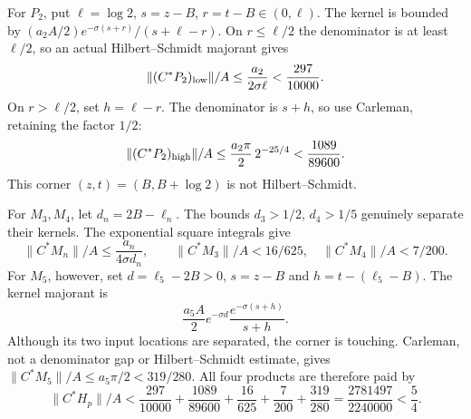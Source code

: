\documentclass[11pt,a4paper]{article}
\numberwithin{equation}{section}
\theoremstyle{remark}\newtheorem{remark}[theorem]{Remark}
\newcommand{\norm}[1]{\lVert#1\rVert}\newcommand{\abs}[1]{\lvert#1\rvert}
\begin{document}
For $P_2$, put $\ell=\log2$, $s=z-B$, $r=t-B\in(0,\ell)$.
The kernel is bounded by
$(a_2A/2)e^{-\sigma(s+r)}/(s+\ell-r)$.
On $r\le\ell/2$ the denominator is at least $\ell/2$, so an actual Hilbert--Schmidt majorant gives
\[
 \norm{(C^*P_2)_{\rm low}}/A
 \le\frac{a_2}{2\sigma\ell}<\frac{297}{10000}.
\]
On $r>\ell/2$, set $h=\ell-r$. The denominator is $s+h$, so use Carleman, retaining the factor $1/2$:
\[
 \norm{(C^*P_2)_{\rm high}}/A
 \le\frac{a_2\pi}{2}\,2^{-25/4}<\frac{1089}{89600}.
\]
This corner $(z,t)=(B,B+\log2)$ is not Hilbert--Schmidt.

For $M_3,M_4$, let $d_n=2B-\ell_n$. The bounds
$d_3>1/2$, $d_4>1/5$ genuinely separate their kernels.
The exponential square integrals give
\[
 \norm{C^*M_n}/A\le\frac{a_n}{4\sigma d_n},\qquad
 \norm{C^*M_3}/A<16/625,\quad \norm{C^*M_4}/A<7/200.
\]
For $M_5$, however, set $d=\ell_5-2B>0$,
$s=z-B$ and $h=t-(\ell_5-B)$.
The kernel majorant is
\[
 \frac{a_5A}{2}e^{-\sigma d}\frac{e^{-\sigma(s+h)}}{s+h}.
\]
Although its two input locations are separated, the corner is touching.
Carleman, not a denominator gap or Hilbert--Schmidt estimate, gives
$\norm{C^*M_5}/A\le a_5\pi/2<319/280$.
All four products are therefore paid by
\begin{equation}\label{eq:CHp}
 \norm{C^*H_p}/A<
 \frac{297}{10000}+\frac{1089}{89600}+\frac{16}{625}
 +\frac7{200}+\frac{319}{280}
 =\frac{2781497}{2240000}<\frac54.
\end{equation}
\end{document}
